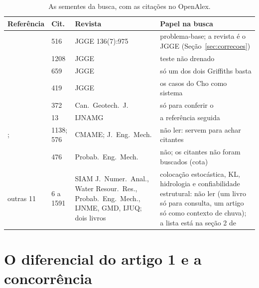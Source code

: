 \documentclass[11pt,a4paper]{article}
\begin{document}
\begin{table}[H]\centering\small\setlength{\tabcolsep}{4pt}
\caption{As sementes da busca, com as citações no OpenAlex.}\label{tab:sementes}
\begin{tabular}{L{4.2cm}L{1.5cm}L{2.9cm}L{6.6cm}}
\toprule
Referência & Cit. & Revista & Papel na busca \\
\midrule
\citet{cho2010} & 516 & JGGE 136(7):975 & problema-base; a revista é o JGGE (Seção~\ref{sec:correcoes}) \\
\citet{griffiths2004} & 1208 & JGGE & teste não drenado \\
\citet{griffiths2009} & 659 & JGGE & só um dos dois Griffiths basta \\
\citet{jiang2015} & 419 & JGGE & os casos do Cho como sistema \\
\citet{wang2011} & 372 & Can.\ Geotech.\ J. & só para conferir o  \\
\citet{vargasceron2025} & 13 & IJNAMG & a referência seguida \\
\citet{stefanou2009}; \citet{spanos1989} & 1138; 576 & CMAME; J.\ Eng.\ Mech. & não ler: servem para achar citantes \\
\citet{bergman1997} & 476 & Probab.\ Eng.\ Mech. & não; os citantes não foram buscados (cota) \\
outras 11 & 6 a 1591 & SIAM J.\ Numer.\ Anal., Water Resour.\ Res., Probab.\ Eng.\ Mech., IJNME, GMD, IJUQ; dois
  livros & colocação estocástica, KL, hidrologia e confiabilidade estrutural: não ler (um livro só para consulta, um
  artigo só como contexto de chuva); a lista está na seção 2 de  \\
\bottomrule
\end{tabular}
\end{table}

\section{O diferencial do artigo 1 e a concorrência}\label{sec:art1}
\end{document}
